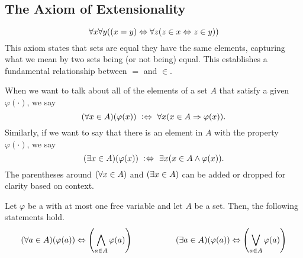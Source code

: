 \subsection{The Axiom of Extensionality}
\begin{axiom}[Extensionality]\label{ax:extensionality}
    \vspace{-\abovedisplayskip}
    \[
        \forall x \forall y \pn*{\pn*{x = y} \iff \forall z \pn*{z \in x \iff z \in y}}
    \]
    This axiom states that sets are equal \ifandonlyif they have the same elements,
    capturing what we mean by two sets being (or not being) equal.
    This establishes a fundamental relationship between \(=\) and \(\in\).
\end{axiom}

\begin{definition}
    When we want to talk about all of the elements of a set \(A\) that satisfy a given {\wff} \(\varphi(\cdot)\),
    we say
    \[
        \pn*{\forall x \in A}\pn*{\varphi(x)} \iffdefn \forall x \pn*{x \in A \implies \varphi(x)}.
    \]
    Similarly, if we want to say that there is an element in \(A\) with the property \(\varphi(\cdot)\),
    we say
    \[
        \pn*{\exists x \in A}\pn*{\varphi(x)} \iffdefn \exists x \pn*{x \in A \meet \varphi(x)}.
    \]
    The parentheses around \(\pn*{\forall x \in A}\) and \(\pn*{\exists x \in A}\)
    can be added or dropped for clarity based on context.
\end{definition}

\begin{theorem}
    Let \(\varphi\) be a {\wff} with at most one free variable and let \(A\) be a set.
    Then, the following statements hold.
    \[
        \pn*{\forall a \in A}\pn*{\varphi(a)} \iff \pn*{\bigmeet_{a \in A}\varphi(a)}
        ~~~~~~~~~~~~~~~~
        \pn*{\exists a \in A}\pn*{\varphi(a)} \iff \pn*{\bigjoin_{a \in A}\varphi(a)}
    \]
\end{theorem}
% 

